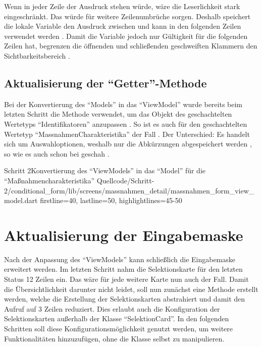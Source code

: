 Wenn in jeder Zeile der Ausdruck  stehen würde, wäre die Leserlichkeit stark eingeschränkt.
Das würde für weitere Zeilenumbrüche sorgen.
Deshalb speichert die lokale Variable  den Ausdruck zwischen und kann in den folgenden Zeilen verwendet werden .
Damit die Variable  jedoch nur Gültigkeit für die folgenden Zeilen hat, begrenzen die öffnenden und schließenden geschweiften Klammern den Sichtbarkeitsbereich .

\subsection{Aktualisierung der \enquote{Getter}-Methode}

Bei der Konvertierung des \enquote{Models} in das \enquote{ViewModel} wurde bereits beim letzten Schritt die Methode  verwendet,
um das Objekt des geschachtelten Wertetyps \enquote{Identifikatoren} anzupassen .
So ist es auch für den geschachtelten Wertetyp \enquote{MassnahmenCharakteristika} der Fall .
Der Unterschied: Es handelt sich um Auswahloptionen, weshalb nur die Abkürzungen abgespeichert werden , so wie es auch schon bei  geschah .

\begin{alexlisting}{Schritt 2}{Konvertierung des \enquote{ViewModels} in das \enquote{Model} für die \enquote{Maßnahmencharakteristika}}
  {Quellcode/Schritt-2/conditional_form/lib/screens/massnahmen_detail/massnahmen_form_view_model.dart}
  {firstline=40, lastline=50, highlightlines={45-50}}
  \label{lst:Schritt2KonvertierungDesViewModelsInDasModel}
\end{alexlisting}

\section{Aktualisierung der Eingabemaske}

Nach der Anpassung des \enquote{ViewModels} kann schließlich die Eingabemaske erweitert werden.
Im letzten Schritt nahm die Selektionskarte für den letzten Status 12 Zeilen ein. 
Das wäre für jede weitere Karte nun auch der Fall.
Damit die Übersichtlichkeit darunter nicht leidet, soll nun zunächst eine Methode erstellt werden, welche die Erstellung der Selektionskarten abstrahiert und damit den Aufruf auf 3 Zeilen reduziert.
Dies erlaubt auch die Konfiguration der Selektionskarten außerhalb der Klasse \enquote{SelektionCard}.
In den folgenden Schritten soll diese Konfigurationsmöglichkeit genutzt werden, um weitere Funktionalitäten hinzuzufügen, ohne die Klasse selbst zu manipulieren.

